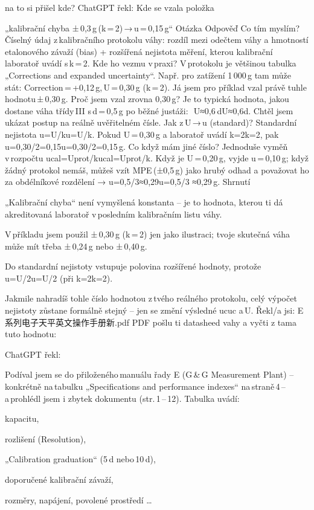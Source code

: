 {na to si přišel kde?
ChatGPT řekl:
Kde se vzala položka

„kalibrační chyba ± 0,3 g (k = 2) → u = 0,15 g“
Otázka	Odpověď
Co tím myslím?	Číselný údaj z kalibračního protokolu váhy: rozdíl mezi odečtem váhy a hmotností etalonového závaží (bias) + rozšířená nejistota měření, kterou kalibrační laboratoř uvádí s k = 2.
Kde ho vezmu v praxi?	V protokolu je většinou tabulka „Corrections and expanded uncertainty“. Např. pro zatížení 1 000 g tam může stát: Correction = +0,12 g, U = 0,30 g (k = 2). Já jsem pro příklad vzal právě tuhle hodnotu ± 0,30 g.
Proč jsem vzal zrovna 0,30 g?	Je to typická hodnota, jakou dostane váha třídy III s d = 0,5 g po běžné justáži:   U≈0,6 dU≈0,6d. Chtěl jsem ukázat postup na reálně uvěřitelném čísle.
Jak z U → u (standard)?	Standardní nejistota u=U/ku=U/k. Pokud U = 0,30 g a laboratoř uvádí k=2k=2, pak u=0,30/2=0,15u=0,30/2=0,15 g.
Co když mám jiné číslo?	Jednoduše vyměň v rozpočtu ucal=Uprot/kucal​=Uprot​/k. Když je U = 0,20 g, vyjde u = 0,10 g; když žádný protokol nemáš, můžeš vzít MPE (±0,5 g) jako hrubý odhad a považovat ho za obdélníkové rozdělení → u=0,5/3≈0,29u=0,5/3
​≈0,29 g.
Shrnutí

    „Kalibrační chyba“ není vymyšlená konstanta – je to hodnota, kterou ti dá akreditovaná laboratoř v posledním kalibračním listu váhy.

    V příkladu jsem použil ± 0,30 g (k = 2) jen jako ilustraci; tvoje skutečná váha může mít třeba ± 0,24 g nebo ± 0,40 g.

    Do standardní nejistoty vstupuje polovina rozšířené hodnoty, protože u=U/2u=U/2 (při k=2k=2).

Jakmile nahradíš tohle číslo hodnotou z tvého reálného protokolu, celý výpočet nejistoty zůstane formálně stejný – jen se změní výsledné ucuc​ a U.
Řekl/a jsi:
E系列电子天平英文操作手册新.pdf
PDF
pošlu ti datasheed vahy a vyčti z tama tuto hodnotu:

ChatGPT řekl:

Podíval jsem se do přiloženého manuálu řady E (G & G Measurement Plant) – konkrétně na tabulku „Specifications and performance indexes“ na straně 4 – a prohlédl jsem i zbytek dokumentu (str. 1 – 12). Tabulka uvádí:

    kapacitu,

    rozlišení (Resolution),

    „Calibration graduation“ (5 d nebo 10 d),

    doporučené kalibrační závaží,

    rozměry, napájení, povolené prostředí …

}
